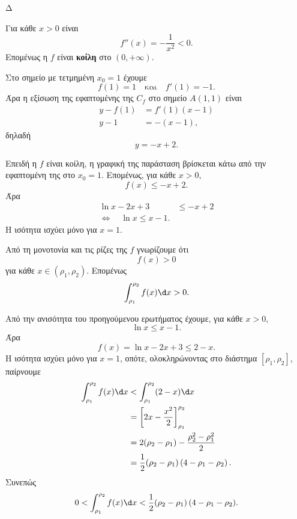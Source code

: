 \begin{thema}{Δ}
\begin{erwthma}
\item Για κάθε $x>0$ είναι
\[
f''(x)=-\frac{1}{x^2}<0.
\]
Επομένως η $f$ είναι \textbf{κοίλη} στο $(0,+\infty)$.

Στο σημείο με τετμημένη $x_0=1$ έχουμε
\[
f(1)=1
\quad\text{και}\quad
f'(1)=-1.
\]
Άρα η εξίσωση της εφαπτομένης της $C_f$ στο σημείο $A(1,1)$ είναι
\begin{align*}
y-f(1)&=f'(1)(x-1)\\
y-1&=-(x-1),
\end{align*}
δηλαδή
\[
{y=-x+2}.
\]

Επειδή η $f$ είναι κοίλη, η γραφική της παράσταση βρίσκεται κάτω από την εφαπτομένη της στο $x_0=1$. Επομένως, για κάθε $x>0$,
\[
f(x)\leq -x+2.
\]
Άρα
\begin{align*}
\ln x-2x+3&\leq-x+2\\
\Leftrightarrow\quad
{\ln x\leq x-1}.
\end{align*}
Η ισότητα ισχύει μόνο για $x=1$.

\item Από τη μονοτονία και τις ρίζες της $f$ γνωρίζουμε ότι
\[
f(x)>0
\]
για κάθε $x\in(\rho_1,\rho_2)$. Επομένως
\[
\int_{\rho_1}^{\rho_2}f(x)\d x>0.
\]

Από την ανισότητα του προηγούμενου ερωτήματος έχουμε, για κάθε $x>0$,
\[
\ln x\leq x-1.
\]
Άρα
\[
f(x)=\ln x-2x+3\leq2-x.
\]
Η ισότητα ισχύει μόνο για $x=1$, οπότε, ολοκληρώνοντας στο διάστημα $[\rho_1,\rho_2]$, παίρνουμε
\begin{align*}
\int_{\rho_1}^{\rho_2}f(x)\d x
&<\int_{\rho_1}^{\rho_2}(2-x)\d x\\
&=\left[2x-\frac{x^2}{2}\right]_{\rho_1}^{\rho_2}\\
&=2(\rho_2-\rho_1)-\frac{\rho_2^2-\rho_1^2}{2}\\
&=\frac{1}{2}(\rho_2-\rho_1)
\left(4-\rho_1-\rho_2\right).
\end{align*}
Συνεπώς
\[
{
0<\int_{\rho_1}^{\rho_2}f(x)\d x
<\frac{1}{2}(\rho_2-\rho_1)
\left(4-\rho_1-\rho_2\right)}.
\]
\end{erwthma}
\end{thema}

